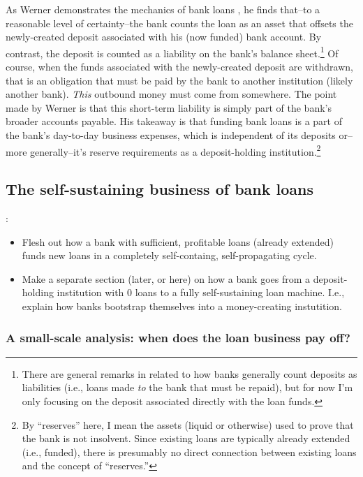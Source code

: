 As Werner demonstrates the mechanics of bank loans \cite{Werner2014}, he finds that--to a reasonable level of certainty--the bank counts the loan as an asset that offsets the newly-created deposit associated with his (now funded) bank account.  By contrast, the deposit is counted as a liability on the bank's balance sheet.\footnote{There are general remarks in \cite{Werner2014} related to how banks generally count deposits as liabilities (i.e., loans made {\it to} the bank that must be repaid), but for now I'm only focusing on the deposit associated directly with the loan funds.}  Of course, when the funds associated with the newly-created deposit are withdrawn, that is an obligation that must be paid by the bank to another institution (likely another bank).  {\it This} outbound money must come from somewhere.  The point made by Werner \cite{Werner2014} is that this short-term liability is simply part of the bank's broader accounts payable.  His takeaway is that funding bank loans is a part of the bank's day-to-day business expenses, which is independent of its deposits or--more generally--it's reserve requirements as a deposit-holding institution.\footnote{By ``reserves'' here, I mean the assets (liquid or otherwise) used to prove that the bank is not insolvent.  Since existing loans are typically already extended (i.e., funded), there is presumably no direct connection between existing loans and the concept of ``reserves.''}


\subsection{The self-sustaining business of bank loans}

\note{[Todo]}:
\begin{itemize}
    \item Flesh out how a bank with sufficient, profitable loans (already extended) funds new loans in a completely self-containg, self-propagating cycle.
    \item Make a separate section (later, or here) on how a bank goes from a deposit-holding institution with 0 loans to a fully self-sustaining loan machine.  I.e., explain how banks bootstrap themselves into a money-creating instutition.
\end{itemize}


\subsubsection{A small-scale analysis: when does the loan business pay off?}

